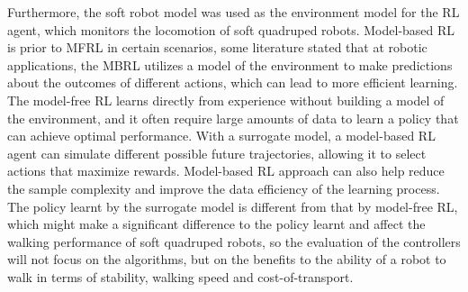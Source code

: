  Furthermore, the soft robot model was used as the environment model for the \ac{RL} agent\cite{jiSynthesizingOptimalGait2022}, which monitors the locomotion of soft quadruped robots. Model-based \ac{RL} is prior to \ac{MFRL} in certain scenarios, some literature\cite{polydorosSurveyModelBasedReinforcement2017,wangBenchmarkingModelBasedReinforcement2019} stated that at robotic applications, the \ac{MBRL} utilizes a model of the environment to make predictions about the outcomes of different actions, which can lead to more efficient learning. The model-free \ac{RL} learns directly from experience without building a model of the environment\cite{arulkumaranDeepReinforcementLearning2017}, and it often require large amounts of data to learn a policy that can achieve optimal performance\cite{calisirModelFreeReinforcementLearning2019}. With a surrogate model, a model-based \ac{RL} agent can simulate different possible future trajectories, allowing it to select actions that maximize rewards\cite{fazeliSeeFeelAct2019}. Model-based \ac{RL} approach can also help reduce the sample complexity and improve the data efficiency of the learning process\cite{atkesonComparisonDirectModelbased1997}. The policy learnt by the surrogate model is different from that by model-free \ac{RL}\cite{fazeliSeeFeelAct2019}, which might make a significant difference to the policy learnt and affect the walking performance of soft quadruped robots, so the evaluation of the controllers will not focus on the algorithms, but on the benefits to the ability of a robot to walk in terms of stability, walking speed and cost-of-transport. 

